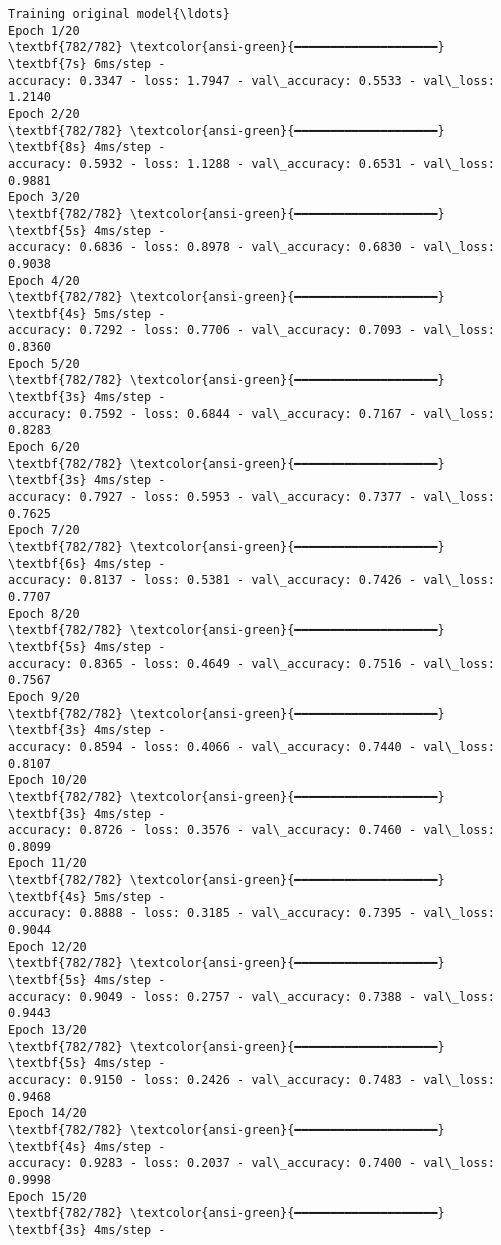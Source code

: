 \documentclass[11pt]{article}
\begin{document}
    \begin{Verbatim}[commandchars=\\\{\}]
Training original model{\ldots}
Epoch 1/20
\textbf{782/782} \textcolor{ansi-green}{━━━━━━━━━━━━━━━━━━━━} \textbf{7s} 6ms/step -
accuracy: 0.3347 - loss: 1.7947 - val\_accuracy: 0.5533 - val\_loss: 1.2140
Epoch 2/20
\textbf{782/782} \textcolor{ansi-green}{━━━━━━━━━━━━━━━━━━━━} \textbf{8s} 4ms/step -
accuracy: 0.5932 - loss: 1.1288 - val\_accuracy: 0.6531 - val\_loss: 0.9881
Epoch 3/20
\textbf{782/782} \textcolor{ansi-green}{━━━━━━━━━━━━━━━━━━━━} \textbf{5s} 4ms/step -
accuracy: 0.6836 - loss: 0.8978 - val\_accuracy: 0.6830 - val\_loss: 0.9038
Epoch 4/20
\textbf{782/782} \textcolor{ansi-green}{━━━━━━━━━━━━━━━━━━━━} \textbf{4s} 5ms/step -
accuracy: 0.7292 - loss: 0.7706 - val\_accuracy: 0.7093 - val\_loss: 0.8360
Epoch 5/20
\textbf{782/782} \textcolor{ansi-green}{━━━━━━━━━━━━━━━━━━━━} \textbf{3s} 4ms/step -
accuracy: 0.7592 - loss: 0.6844 - val\_accuracy: 0.7167 - val\_loss: 0.8283
Epoch 6/20
\textbf{782/782} \textcolor{ansi-green}{━━━━━━━━━━━━━━━━━━━━} \textbf{3s} 4ms/step -
accuracy: 0.7927 - loss: 0.5953 - val\_accuracy: 0.7377 - val\_loss: 0.7625
Epoch 7/20
\textbf{782/782} \textcolor{ansi-green}{━━━━━━━━━━━━━━━━━━━━} \textbf{6s} 4ms/step -
accuracy: 0.8137 - loss: 0.5381 - val\_accuracy: 0.7426 - val\_loss: 0.7707
Epoch 8/20
\textbf{782/782} \textcolor{ansi-green}{━━━━━━━━━━━━━━━━━━━━} \textbf{5s} 4ms/step -
accuracy: 0.8365 - loss: 0.4649 - val\_accuracy: 0.7516 - val\_loss: 0.7567
Epoch 9/20
\textbf{782/782} \textcolor{ansi-green}{━━━━━━━━━━━━━━━━━━━━} \textbf{3s} 4ms/step -
accuracy: 0.8594 - loss: 0.4066 - val\_accuracy: 0.7440 - val\_loss: 0.8107
Epoch 10/20
\textbf{782/782} \textcolor{ansi-green}{━━━━━━━━━━━━━━━━━━━━} \textbf{3s} 4ms/step -
accuracy: 0.8726 - loss: 0.3576 - val\_accuracy: 0.7460 - val\_loss: 0.8099
Epoch 11/20
\textbf{782/782} \textcolor{ansi-green}{━━━━━━━━━━━━━━━━━━━━} \textbf{4s} 5ms/step -
accuracy: 0.8888 - loss: 0.3185 - val\_accuracy: 0.7395 - val\_loss: 0.9044
Epoch 12/20
\textbf{782/782} \textcolor{ansi-green}{━━━━━━━━━━━━━━━━━━━━} \textbf{5s} 4ms/step -
accuracy: 0.9049 - loss: 0.2757 - val\_accuracy: 0.7388 - val\_loss: 0.9443
Epoch 13/20
\textbf{782/782} \textcolor{ansi-green}{━━━━━━━━━━━━━━━━━━━━} \textbf{5s} 4ms/step -
accuracy: 0.9150 - loss: 0.2426 - val\_accuracy: 0.7483 - val\_loss: 0.9468
Epoch 14/20
\textbf{782/782} \textcolor{ansi-green}{━━━━━━━━━━━━━━━━━━━━} \textbf{4s} 4ms/step -
accuracy: 0.9283 - loss: 0.2037 - val\_accuracy: 0.7400 - val\_loss: 0.9998
Epoch 15/20
\textbf{782/782} \textcolor{ansi-green}{━━━━━━━━━━━━━━━━━━━━} \textbf{3s} 4ms/step -

\end{Verbatim}
\end{document}
